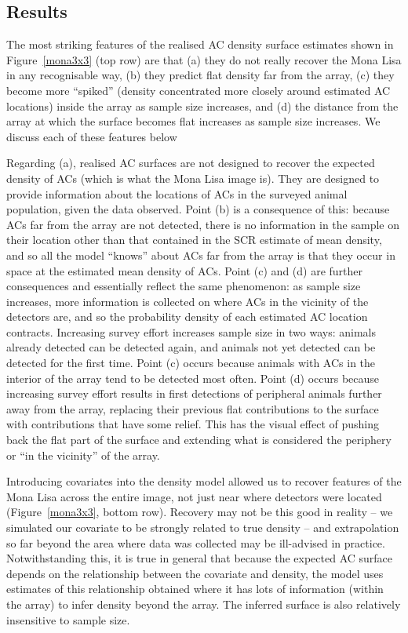 \documentclass[useAMS,usenatbib,referee]{biom}
\begin{document}
\subsection{Results}
The most striking features of the realised AC density surface estimates shown in Figure~\ref{mona3x3} (top row) are that (a) they do not really recover the Mona Lisa in any recognisable way, (b) they predict flat density far from the array, (c) they become more ``spiked'' (density concentrated more closely around estimated AC locations) inside the array as sample size increases, and (d) the distance from the array at which the surface becomes flat increases as sample size increases. We discuss each of these features below

Regarding (a), realised AC surfaces are not designed to recover the expected density of ACs (which is what the Mona Lisa image is). They are designed to provide information about the locations of ACs in the surveyed animal population, given the data observed. Point (b) is a consequence of this: because ACs far from the array are not detected, there is no information in the sample on their location other than that contained in the SCR estimate of mean density, and so all the model ``knows'' about ACs far from the array is that they occur in space at the estimated mean density of ACs. Point (c) and (d) are further consequences and essentially reflect the same phenomenon: as sample size increases, more information is collected on where ACs in the vicinity of the detectors are, and so the probability density of each estimated AC location contracts. Increasing survey effort increases sample size in two ways: animals already detected can be detected again, and animals not yet detected can be detected for the first time. Point (c) occurs because animals with ACs in the interior of the array tend to be detected most often. Point (d) occurs because increasing survey effort results in first detections of peripheral animals further away from the array, replacing their previous flat contributions to the surface with contributions that have some relief. This has the visual effect of pushing back the flat part of the surface and extending what is considered the periphery or ``in the vicinity'' of the array. 

Introducing covariates into the density model allowed us to recover features of the Mona Lisa across the entire image, not just near where detectors were located (Figure~\ref{mona3x3}, bottom row). Recovery may not be this good in reality -- we simulated our covariate to be strongly related to true density -- and extrapolation so far beyond the area where data was collected may be ill-advised in practice. Notwithstanding this, it is true in general that because the expected AC surface depends on the relationship between the covariate and density, the model uses estimates of this relationship obtained where it has lots of information (within the array) to infer density beyond the array. The inferred surface is also relatively insensitive to sample size.
\end{document}

